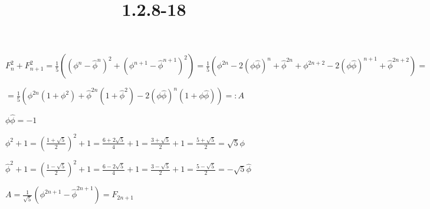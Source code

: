 \documentclass{article}
\title{1.2.8-18}
\begin{document}
\maketitle

$F_n^2 + F_{n+1}^2 = \frac{1}{5}((\phi^n-\hat\phi^n)^2 + (\phi^{n+1}-\hat\phi^{n+1})^2) = \frac{1}{5}(\phi^{2n} - 2(\phi\hat\phi)^n + \hat\phi^{2n} + \phi^{2n+2} - 2(\phi\hat\phi)^{n+1} + \hat\phi^{2n+2}) =$

$= \frac{1}{5}(\phi^{2n}(1+\phi^2) + \hat\phi^{2n}(1+\hat\phi^2) - 2(\phi\hat\phi)^n(1+\phi\hat\phi)) =: A$

$\phi\hat\phi = -1$

$\phi^2 + 1 = (\frac{1+\sqrt{5}}{2})^2 + 1 = \frac{6 + 2\sqrt{5}}{4} + 1 = \frac{3+\sqrt{5}}{2} + 1 = \frac{5+\sqrt{5}}{2} = \sqrt{5} \phi$

$\hat\phi^2 + 1 = (\frac{1-\sqrt{5}}{2})^2 + 1 = \frac{6 - 2\sqrt{5}}{4} + 1 = \frac{3-\sqrt{5}}{2} + 1 = \frac{5-\sqrt{5}}{2} = -\sqrt{5} \hat\phi$

$A = \frac{1}{\sqrt{5}}(\phi^{2n+1} - \hat\phi^{2n+1}) = F_{2n+1}$
\end{document}
